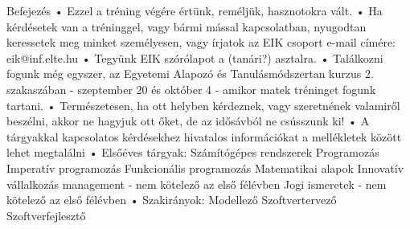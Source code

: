 \documentclass[../Main.tex]{subfiles}
\begin{document}
Befejezés
    • Ezzel a tréning végére értünk, reméljük, hasznotokra vált. 
    • Ha kérdésetek van a tréninggel, vagy bármi mással kapcsolatban, nyugodtan keressetek meg minket személyesen, vagy írjatok az EIK csoport e-mail címére: eik@inf.elte.hu
    • Tegyünk EIK szórólapot a (tanári?) asztalra.
    • Találkozni fogunk még egyszer, az Egyetemi Alapozó és Tanulásmódszertan kurzus 2. szakaszában - szeptember 20 és október 4 - amikor matek tréninget fogunk tartani.
    • Természetesen, ha ott helyben kérdeznek, vagy szeretnének valamiről beszélni, akkor ne hagyjuk ott őket, de az idősávból ne csússzunk ki!
    • A tárgyakkal kapcsolatos kérdésekhez hivatalos információkat a mellékletek között lehet megtalálni
    • Elsőéves tárgyak:
Számítógépes rendszerek
Programozás
Imperatív programozás
Funkcionális programozás
Matematikai alapok
Innovatív vállalkozás management - nem kötelező az első félévben
Jogi ismeretek - nem kötelező az első félévben
    • Szakirányok:
Modellező
Szoftvertervező
Szoftverfejlesztő
\end{document}
